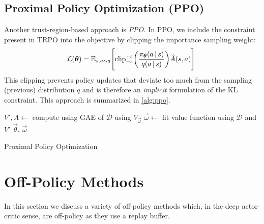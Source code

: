 		\subsection{Proximal Policy Optimization (\acs{PPO})}
			Another trust-region-based approach is \emph{\ac{PPO}.} In \ac{PPO}, we include the constraint present in \ac{TRPO} into the objective by clipping the importance sampling weight:
			\begin{equation}
				\mathcal{L}(\bm{\theta}) = \mathbb{E}_{s, a \sim q}\Biggl[ \operatorname{clip}_{-\varepsilon}^{+\varepsilon}\biggl( \frac{\pi_{\bm{\theta}}(a \,\vert\, s)}{q(a \,\vert\, s)} \biggr) \hat{A}(s, a) \Biggr].
			\end{equation}
			This clipping prevents policy updates that deviate too much from the sampling (previous) distribution \(q\) and is therefore an \emph{implicit} formulation of the \ac{KL} constraint. This approach is summarized in \autoref{alg:ppo}.

			\begin{algorithm}  \DontPrintSemicolon
				\(\displaystyle V', A \gets \) compute using \acs{GAE} of \(\mathcal{D}\) using \(V_{\vec{\omega}}\) \;
				\(\displaystyle \vec{\omega} \gets \) fit value function using \(\mathcal{D}\) and \(V'\) \;
				\Return \(\vec{\theta}\), \(\vec{\omega}\) \;
				\caption{Proximal Policy Optimization}
				\label{alg:ppo}
			\end{algorithm}

	\section{Off-Policy Methods}
		In this section we discuss a variety of off-policy methods which, in the deep actor-critic sense, are off-policy as they use a replay buffer.

